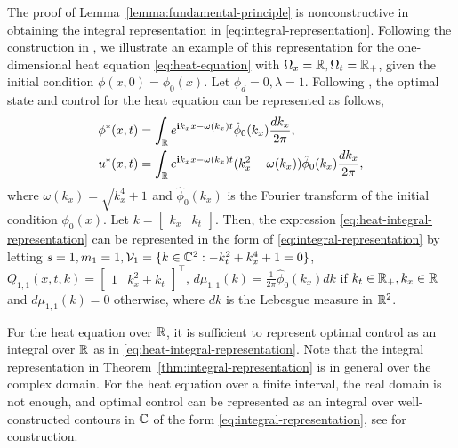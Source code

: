 \documentclass[letterpaper, 10 pt, conference]{ieeeconf}  %
\begin{document}
\begin{example}
   The proof of Lemma~\ref{lemma:fundamental-principle} is nonconstructive in obtaining the integral representation in \eqref{eq:integral-representation}.
   Following the construction in \cite{bamieh2002distributed}, we illustrate an example of this representation for the one-dimensional heat equation \eqref{eq:heat-equation} with $\Omega_x=\mathbb{R},\Omega_t = \mathbb{R}_+$, given the initial condition $\phi(x,0) = \phi_0(x)$.
   Let $\phi_d=0, \lambda=1$. 
   Following \cite[Section V-B]{bamieh2002distributed}, the optimal state and control for the heat equation can be represented as follows,
\begin{equation}\label{eq:heat-integral-representation}
   \begin{split}
         \phi^*(x,t) &= \int_{\mathbb{R}} e^{\mathbf{i} k_x x - \omega(k_x)t} \hat{\phi}_0(k_x) \frac{dk_x}{2\pi},\\
    u^*(x,t) &= \int_{\mathbb{R}} e^{\mathbf{i} k_x x - \omega(k_x)t} (k_x^2-\omega(k_x))\hat{\phi}_0(k_x) \frac{dk_x}{2\pi},
   \end{split}
\end{equation}
where $\omega(k_x)=\sqrt{k_x^4+1}$ and $\hat{\phi}_0(k_x)$ is the Fourier transform of the initial condition $\phi_0(x)$.
Let $k= \begin{bmatrix}
k_x & k_t
\end{bmatrix}$. Then, the expression \eqref{eq:heat-integral-representation} can be represented in the form of \eqref{eq:integral-representation} by letting $s=1,m_1=1,\mathcal V_1 = \{k\in\mathbb{C}^2: -k_t^2 + k_x^4 +1=0\}$, $Q_{1,1}(x,t,k) = \begin{bmatrix}
1 & k_x^2 + k_t
\end{bmatrix}^\top$, $d\mu_{1,1}(k) = \frac{1}{2\pi}\hat{\phi}_0(k_x)dk$ if $k_t \in \mathbb{R}_+, k_x \in \mathbb{R}$ and $d\mu_{1,1}(k) = 0$ otherwise, where $dk$ is the Lebesgue measure in $\mathbb{R}^2$.

For the heat equation over $\mathbb{R}$, it is sufficient to represent optimal control as an integral over $\mathbb{R}$ as in \eqref{eq:heat-integral-representation}. 
Note that the integral representation in Theorem~\ref{thm:integral-representation} is in general over the complex domain.
For the heat equation over a finite interval, the real domain is not enough, and optimal control can be represented as an integral over well-constructed contours in $\mathbb{C}$ of the form \eqref{eq:integral-representation}, see \cite{li2024complex} for construction.
\end{example}
\end{document}
